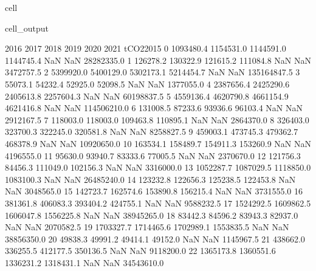 \documentclass[letterpaper,10pt,english]{jupyterBook}
\begin{document}
\begin{sphinxuseclass}{cell}
\begin{sphinxVerbatimOutput}
\begin{sphinxuseclass}{cell_output}
\begin{sphinxVerbatim}[commandchars=\\\{\}]
         2016       2017       2018       2019  2020  2021    tCO2\PYGZus{}2015  \PYGZbs{}
0   1093480.4  1154531.0  1144591.0  1144745.4   NaN   NaN   28282335.0   
1    126278.2   130322.9   121615.2   111084.8   NaN   NaN    3472757.5   
2   5399920.0  5400129.0  5302173.1  5214454.7   NaN   NaN  135164847.5   
3     55073.1    54232.4    52925.0    52098.5   NaN   NaN    1377055.0   
4   2387656.4  2425290.6  2405613.8  2257604.3   NaN   NaN   60198837.5   
5   4559136.4  4620790.8  4661154.9  4621416.8   NaN   NaN  114506210.0   
6    131008.5    87233.6    93936.6    96103.4   NaN   NaN    2912167.5   
7    118003.0   118003.0   109463.8   110895.1   NaN   NaN    2864370.0   
8    326403.0   323700.3   322245.0   320581.8   NaN   NaN    8258827.5   
9    459003.1   473745.3   479362.7   468378.9   NaN   NaN   10920650.0   
10   163534.1   158489.7   154911.3   153260.9   NaN   NaN    4196555.0   
11    95630.0    93940.7    83333.6    77005.5   NaN   NaN    2370670.0   
12   121756.3    84456.3   111049.0   102156.3   NaN   NaN    3316000.0   
13  1052287.7  1087029.5  1118850.0  1083100.3   NaN   NaN   26485240.0   
14   123232.8   122656.3   125238.5   122453.8   NaN   NaN    3048565.0   
15   142723.7   162574.6   153890.8   156215.4   NaN   NaN    3731555.0   
16   381361.8   406083.3   393404.2   424755.1   NaN   NaN    9588232.5   
17  1524292.5  1609862.5  1606047.8  1556225.8   NaN   NaN   38945265.0   
18    83442.3    84596.2    83943.3    82937.0   NaN   NaN    2070582.5   
19  1703327.7  1714465.6  1702989.1  1553835.5   NaN   NaN   38856350.0   
20    49838.3    49991.2    49414.1    49152.0   NaN   NaN    1145967.5   
21   438662.0   336255.5   412177.5   350136.5   NaN   NaN    9118200.0   
22  1365173.8  1360551.6  1336231.2  1318431.1   NaN   NaN   34543610.0   


\end{sphinxVerbatim}
\end{sphinxuseclass}
\end{sphinxVerbatimOutput}
\end{sphinxuseclass}
\end{document}
